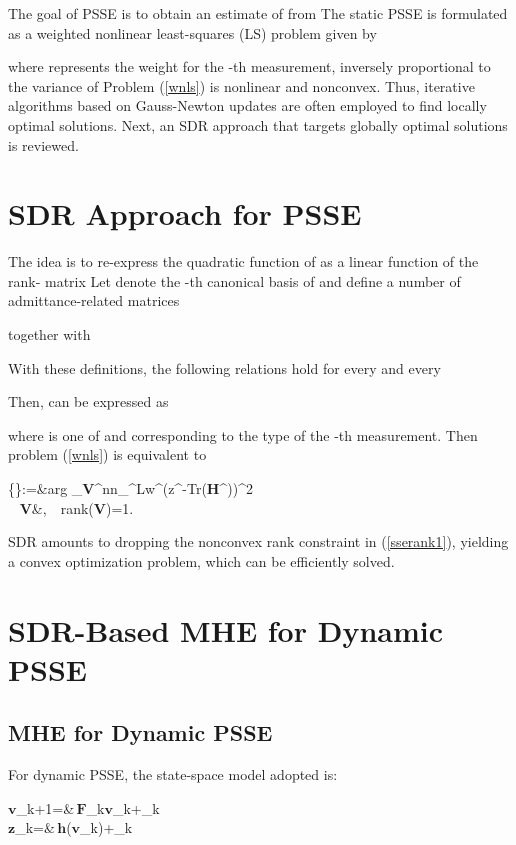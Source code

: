 \documentclass[conference]{IEEEtran}
\def\bbF{{\ensuremath{\mathbf F}}}
\def\bbH{{\ensuremath{\mathbf H}}}
\def\bbV{{\ensuremath{\mathbf V}}}
\def\bbh{{\ensuremath{\mathbf h}}}
\def\bbv{{\ensuremath{\mathbf v}}}
\def\bbz{{\ensuremath{\mathbf z}}}
\def\bb0{{\ensuremath{\mathbf 0}}}
\def\bbeta{{\mbox{\boldmath }}}
\def\bbxi{{\mbox{\boldmath }}}
\begin{document}
The goal of PSSE is to obtain an estimate of  from  The static PSSE is formulated as a weighted nonlinear least-squares (LS) problem given by

where  represents the weight for the -th measurement, inversely proportional to the variance of  Problem (\ref{wnls}) is nonlinear and nonconvex. Thus, iterative algorithms based on Gauss-Newton updates are often employed to find locally optimal solutions. Next, an SDR approach that targets globally optimal solutions is reviewed.

\section{SDR Approach for PSSE}
\label{sec3}
The idea is to re-express the quadratic function  of  as a linear function of the  rank- matrix  Let  denote the -th canonical basis of  and define a number of admittance-related matrices

together with

With these definitions, the following relations hold for every  and every 

Then,  can be expressed as

where  is one of  and  corresponding to the type of the -th measurement. Then problem (\ref{wnls}) is equivalent to

\big\{\hat\bbV\big\}:=&{\rm{arg}}
\limits_{\bbV\in{}^{n\times n}}\sum_{}^{L}w^\ell\Big(z^\ell-{\rm{Tr}}\big(\bbH^\ell\bbV\big)\Big)^2\label{ssevkn}\\
{}~ \bbV&\succeq \bb0,~{}~{\rm{rank}}(\bbV)=1\label{sserank1}.

SDR amounts to dropping the nonconvex rank constraint in (\ref{sserank1}), yielding a convex optimization problem, which can be efficiently solved.




\section{SDR-Based MHE for Dynamic PSSE}
\label{sec4}
\subsection{MHE for Dynamic PSSE}
For dynamic PSSE, the state-space model adopted is:

\bbv_{k+1}=&\,\bbF_k{\bbv}_k+{\bbxi}_k\label{system eq}\\
\bbz_k=&\,\bbh(\bbv_k)+\bbeta_k\label{observation eq}
\end{document}
